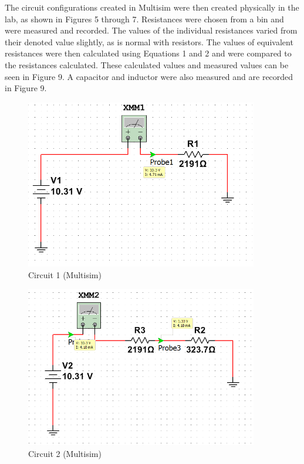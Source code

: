 \documentclass[12pt]{article}
\begin{document}
The circuit configurations created in Multisim were then created physically in the lab, as shown in Figures 5 through 7. Resistances were chosen from a bin and were measured and recorded. The values of the individual resistances varied from their denoted value slightly, as is normal with resistors. The values of equivalent resistances were then calculated using Equations 1 and 2 and were compared to the resistances calculated. These calculated values and measured values can be seen in Figure 9. A capacitor and inductor were also measured and are recorded in Figure 9.
\bigskip

\begin{figure}[h!] %
   \centering
   \includegraphics[width=4in]{Circuit_1.PNG} 
   \caption{Circuit 1 (Multisim)}
   \label{fig:example}
\end{figure}

\newpage

\begin{figure}[h!] %
   \centering
   \includegraphics[width=4in]{Circuit_2.PNG} 
   \caption{Circuit 2 (Multisim)}
   \label{fig:example}
\end{figure}
\end{document}

